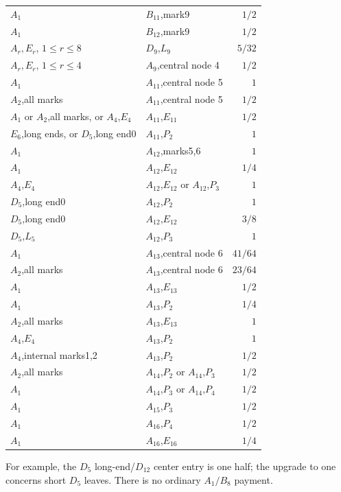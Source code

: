 \documentclass[11pt]{article}
\theoremstyle{remark}\newtheorem{remark}[theorem]{Remark}
\begin{document}
{\begin{longtable}{p{}p{}r}
 $A_{1}$ & $B_{11}$,mark9 & $1/2$ \\
 $A_{1}$ & $B_{12}$,mark9 & $1/2$ \\
 $A_r,E_r$, $1\le r\le8$ & $D_{9}$,$L_{9}$ & $5/32$ \\
 $A_r,E_r$, $1\le r\le4$ & $A_{9}$,central node 4 & $1/2$ \\
 $A_{1}$ & $A_{11}$,central node 5 & $1$ \\
 $A_{2}$,all marks & $A_{11}$,central node 5 & $1/2$ \\
 $A_{1}$ or $A_{2}$,all marks, or $A_{4}$,$E_{4}$ & $A_{11}$,$E_{11}$ & $1/2$ \\
 $E_{6}$,long ends, or $D_{5}$,long end0 & $A_{11}$,$P_{2}$ & $1$ \\
 $A_{1}$ & $A_{12}$,marks5,6 & $1$ \\
 $A_{1}$ & $A_{12}$,$E_{12}$ & $1/4$ \\
 $A_{4}$,$E_{4}$ & $A_{12}$,$E_{12}$ or $A_{12}$,$P_{3}$ & $1$ \\
 $D_{5}$,long end0 & $A_{12}$,$P_{2}$ & $1$ \\
 $D_{5}$,long end0 & $A_{12}$,$E_{12}$ & $3/8$ \\
 $D_{5}$,$L_{5}$ & $A_{12}$,$P_{3}$ & $1$ \\
 $A_{1}$ & $A_{13}$,central node 6 & $41/64$ \\
 $A_{2}$,all marks & $A_{13}$,central node 6 & $23/64$ \\
 $A_{1}$ & $A_{13}$,$E_{13}$ & $1/2$ \\
 $A_{1}$ & $A_{13}$,$P_{2}$ & $1/4$ \\
 $A_{2}$,all marks & $A_{13}$,$E_{13}$ & $1$ \\
 $A_{4}$,$E_{4}$ & $A_{13}$,$P_{2}$ & $1$ \\
 $A_{4}$,internal marks1,2 & $A_{13}$,$P_{2}$ & $1/2$ \\
 $A_{2}$,all marks & $A_{14}$,$P_{2}$ or $A_{14}$,$P_{3}$ & $1/2$ \\
 $A_{1}$ & $A_{14}$,$P_{3}$ or $A_{14}$,$P_{4}$ & $1/2$ \\
 $A_{1}$ & $A_{15}$,$P_{3}$ & $1/2$ \\
 $A_{1}$ & $A_{16}$,$P_{4}$ & $1/2$ \\
 $A_{1}$ & $A_{16}$,$E_{16}$ & $1/4$ \\
\bottomrule
\end{longtable}
}
For example, the $D_5$ long-end/$D_{12}$ center entry is one half;
the upgrade to one concerns short $D_5$ leaves. There is no
ordinary $A_1/B_8$ payment.
\end{document}
